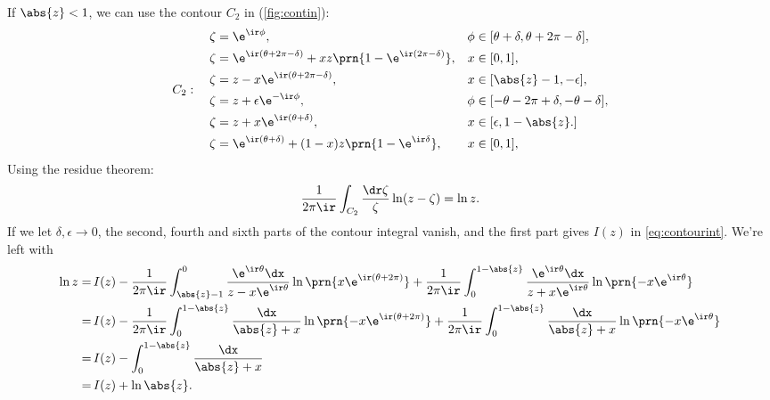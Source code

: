 \documentclass[12pt]{article}
\begin{document}
If $\abs{z}<1$, we can use the contour $C_2$ in (\ref{fig:contin}):
%
\begin{equation}\label{eq:contout}
C_2: \quad
  \begin{aligned}
    \zeta &= \e^{\ir\phi},                             & \phi &\in [\theta+\delta,\theta+2\pi-\delta], \\
    \zeta &= \e^{\ir(\theta+2\pi-\delta)}+xz\prn{1-\e^{\ir(2\pi-\delta)}},
                                                       & x    &\in [0,1], \\
    \zeta &= z - x \e^{\ir(\theta+2\pi-\delta)}, \quad & x    &\in [\abs{z}-1,-\epsilon], \\
    \zeta &= z + \epsilon\e^{-\ir\phi},                & \phi &\in [-\theta-2\pi+\delta,-\theta-\delta], \\
    \zeta &= z + x \e^{\ir(\theta+\delta)},          & x    &\in [\epsilon,1-\abs{z}.] \\
    \zeta &= \e^{\ir(\theta+\delta)}+(1-x)z\prn{1-\e^{\ir\delta}},
                                                       & x    &\in [0,1], \\
  \end{aligned}
\end{equation}
%
Using the residue theorem:
%
\begin{equation}\label{eq:intin}
  \frac{1}{2\pi\ir}\int_{C_2} \frac{\dr\zeta}{\zeta} \ln(z-\zeta) = \ln z.
\end{equation}
%
If we let $\delta,\epsilon\to0$, the second, fourth and sixth parts of the contour integral vanish, and the first part gives $I(z)$ in \eqref{eq:contourint}.
We're left with
%
\begin{equation}\label{eq:intinlim}
  \begin{aligned}
    \ln z =&\, I(z)
           -\frac{1}{2\pi\ir} \int_{\abs{z}-1}^{0} \frac{\e^{\ir\theta}\dx}{z-x\e^{\ir\theta}} \ln\prn{x\e^{\ir(\theta+2\pi)}} %
           +\frac{1}{2\pi\ir} \int_{0}^{1-\abs{z}} \frac{\e^{\ir\theta}\dx}{z+x\e^{\ir\theta}} \ln\prn{-x\e^{\ir\theta}}  \\
      =&\, I(z)
           -\frac{1}{2\pi\ir} \int_{0}^{1-\abs{z}} \frac{\dx}{\abs{z}+x} \ln\prn{-x\e^{\ir(\theta+2\pi)}} %
           +\frac{1}{2\pi\ir} \int_{0}^{1-\abs{z}} \frac{\dx}{\abs{z}+x} \ln\prn{-x\e^{\ir\theta}}  \\
      =&\, I(z) - \int_{0}^{1-\abs{z}} \frac{\dx}{\abs{z}+x}  \\
      =&\, I(z) + \ln\abs{z}.
  \end{aligned}
\end{equation}
%
\end{document}
